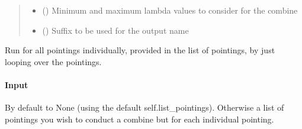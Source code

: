 \documentclass[letterpaper,10pt,english]{sphinxmanual}
\begin{document}
\begin{fulllineitems}
\begin{fulllineitems}
\begin{quote}
\begin{description}
\begin{itemize}
\item {} 
\sphinxAtStartPar
{} () \textendash{} Minimum and maximum lambda values to consider for the combine

\item {} 
\sphinxAtStartPar
{} () \textendash{} Suffix to be used for the output name

\end{itemize}

\end{description}\end{quote}

\end{fulllineitems}


\begin{fulllineitems}
\label{\detokenize{api/pymusepipe:pymusepipe.combine.MusePointings.run_combine_all_single_pointings}}
\pysigstartsignatures
{}
\pysigstopsignatures
\sphinxAtStartPar
Run for all pointings individually, provided in the
list of pointings, by just looping over the pointings.


\paragraph{Input}
\label{\detokenize{api/pymusepipe:id50}}\begin{description}
\sphinxAtStartPar
By default to None (using the default self.list\_pointings).
Otherwise a list of pointings you wish to conduct
a combine but for each individual pointing.


\end{description}
\end{fulllineitems}
\end{fulllineitems}
\end{document}
